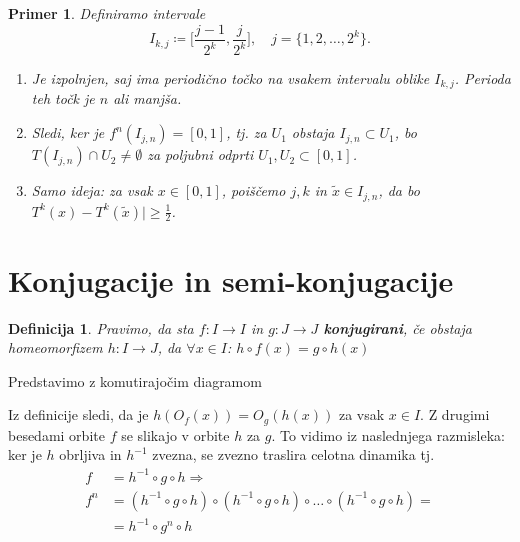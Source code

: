 \documentclass{article}
\newtheorem{definicija}{Definicija}
\newtheorem{primer}{Primer}
\begin{document}
\begin{primer}
Definiramo intervale 
$$
I_{k, j} \coloneqq \Big[\frac{j-1}{2^k}, \frac{j}{2^k}\Big], \quad j = \{1, 2, \dots, 2^k\}.
$$

\begin{enumerate}
\item[C1)] Je izpolnjen, saj ima periodično točko na vsakem intervalu oblike $I_{k, j}$.
Perioda teh točk je $n$ ali manjša.
\item[C2)] Sledi, ker je $f^n(I_{j,n}) = [0, 1]$, tj.
za $U_1$ obstaja $I_{j, n} \subset U_1$, bo $T(I_{j, n}) \cap U_2 \neq \emptyset$ za poljubni odprti $U_1, U_2 \subset [0, 1]$.
\item[C3)] Samo ideja: za vsak $x\in [0, 1]$, poiščemo $j, k$ in $\tilde{x} \in I_{j, n}$, 
da bo $T^k(x) - T^k(\tilde{x})| \geq \frac{1}{2}$.
\end{enumerate}
\end{primer}

\section{Konjugacije in semi-konjugacije}

\begin{definicija}
Pravimo, da sta $f: I \rightarrow I$ in $g: J \rightarrow J$ \textbf{konjugirani}, če obstaja homeomorfizem $h:I \rightarrow J$, da $\forall x\in I$: $h \circ f(x) = g\circ h(x) $
\end{definicija}
Predstavimo z komutirajočim diagramom 
\begin{center}
\end{center}

Iz definicije sledi, da je $h(O_f(x)) = O_g(h(x))$ za vsak $x\in I$. Z drugimi 
besedami orbite $f$ se slikajo v orbite $h$ za $g$. To vidimo iz naslednjega razmisleka: 
ker je $h$ obrljiva in $h^{-1}$ zvezna, se zvezno traslira celotna dinamika tj.
\begin{align*}
f &= h^{-1} \circ g \circ h \Longrightarrow\\ 
f^n &= (h^{-1} \circ g \circ h) \circ (h^{-1} \circ g \circ h) \circ \dots \circ (h^{-1} \circ g \circ h) = \\ 
&= h^{-1} \circ g^n \circ h
\end{align*}
\end{document}
